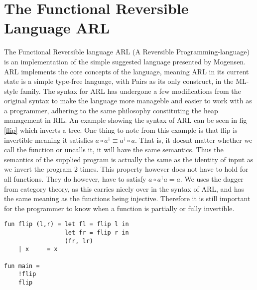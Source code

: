 \documentclass[a4paper]{article}
\begin{document}
\section{The Functional Reversible Language ARL}
\label{sec:orgfe06cb9}
The Functional Reversible language ARL (A Reversible Programming-language) is an
implementation of the simple suggested language presented by Mogensen. ARL implements the core concepts of the language, meaning ARL in its current state is a simple type-free language, with Pairs as its only construct, in the ML-style family. The syntax for ARL has undergone a few modifications from the original syntax to make
the language more manageble and easier to work with as a programmer, adhering to
the same philosophy constituting the heap management in RIL. An example showing the syntax of ARL can be seen in fig \ref{flip} which inverts a tree. One thing to note from this example is
that flip is invertible meaning it satisfies \(a \circ a^{\dag} \equiv a^{\dag} \circ a\).
That is, it doesnt matter whether we call the function or uncalls it, it will have the same semantics. Thus the semantics of the supplied program is actually the same as the identity of input as we invert the program 2 times. This property however does not have to hold for all functions. They do however, have to satisfy \(a \circ a^{\dag} a = a\). We uses the dagger from category theory, as this carries nicely over in the syntax of ARL, and has the same meaning as the functions being injective. Therefore it is still important for the programmer to know when a function is partially or fully invertible.

\begin{verbatim}
fun flip (l,r) = let fl = flip l in
                 let fr = flip r in
                 (fr, lr)
    | x     = x

fun main =
    !flip
    flip
\end{verbatim}
\end{document}
